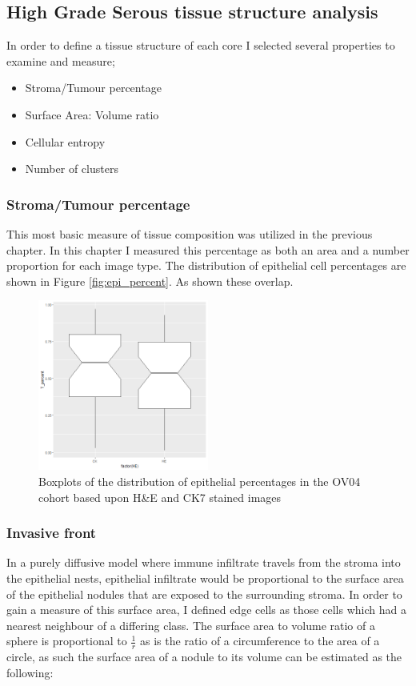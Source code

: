 \subsection{High Grade Serous tissue structure analysis}

In order to define a tissue structure of each core I selected several properties to examine and measure;

\begin{itemize}
    \item Stroma/Tumour percentage
    \item Surface Area: Volume ratio
    \item Cellular entropy
    \item Number of clusters 
\end{itemize}

\subsubsection*{Stroma/Tumour percentage}
This most basic measure of tissue composition was utilized in the previous chapter. In this chapter I measured this percentage as both an area and a number proportion for each image type. The distribution of epithelial cell percentages are shown in Figure \ref{fig:epi_percent}. As shown these overlap. 

\begin{figure}
    \centering
    \includegraphics[width=0.5\textwidth]{Chapter3/Figs/boxplot_epithelium.png}
    \caption{Boxplots of the distribution of epithelial percentages in the OV04 cohort based upon H\&E and CK7 stained images}
    \label{fig:epi_percentl}
\end{figure}

\subsubsection*{Invasive front}
In a purely diffusive model where immune infiltrate travels from the stroma into the epithelial nests, epithelial infiltrate would be proportional to the surface area of the epithelial nodules that are exposed to the surrounding stroma. In order to gain a measure of this surface area, I defined edge cells as those cells which had a nearest neighbour of a differing class. The surface area to volume ratio of a sphere is proportional to $\frac{1}{r}$ as is the ratio of a circumference to the area of a circle, as such the surface area of a nodule to its volume can be estimated as the following:

